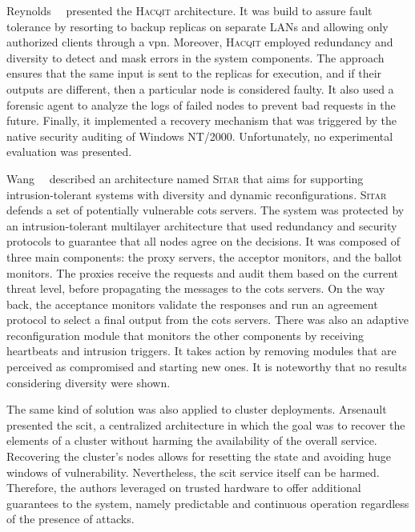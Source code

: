 Reynolds~\etal{}~\cite{Reynolds:2002} presented the \textsc{Hacqit} architecture.
It was build to assure fault tolerance by resorting to backup replicas on separate LANs and allowing only authorized clients through a \gls{vpn}.
Moreover, \textsc{Hacqit} employed redundancy and diversity to detect and mask errors in the system components.
The approach ensures that the same input is sent to the replicas for execution, and if their outputs are different, then a particular node is considered faulty. 
It also used a forensic agent to analyze the logs of failed nodes to prevent bad requests in the future.
Finally, it implemented a recovery mechanism that was triggered by the native security auditing of Windows NT/2000.
Unfortunately, no experimental evaluation was presented.


Wang~\etal{}~\cite{Wang:2003} described an architecture named \textsc{Sitar} that aims for supporting intrusion-tolerant systems with diversity and dynamic reconfigurations.
\textsc{Sitar} defends a set of potentially vulnerable \gls{cots} servers. 
The system was protected by an intrusion-tolerant multilayer architecture that used redundancy and security protocols to guarantee that all nodes agree on the decisions.
It was composed of three main components: the proxy servers, the acceptor monitors, and the ballot monitors.
The proxies receive the requests and audit them based on the current threat level, before propagating the messages to the \gls{cots} servers. 
On the way back, the acceptance monitors validate the responses and run an agreement protocol to select a final output from the \gls{cots} servers.
There was also an adaptive reconfiguration module that monitors the other components by receiving heartbeats and intrusion triggers.
It takes action by removing modules that are perceived as compromised and starting new ones.
It is noteworthy that no results considering diversity were shown.


The same kind of solution was also applied to cluster deployments.
Arsenault~\etal{}~\cite{Arsenault:2007} presented the \gls{scit}, a centralized architecture in which the goal was to recover the elements of a cluster without harming the availability of the overall service.
Recovering the cluster's nodes allows for resetting the state and avoiding huge windows of vulnerability.
Nevertheless, the \gls{scit} service itself can be harmed. 
Therefore, the authors leveraged on trusted hardware to offer additional guarantees to the system, namely predictable and continuous operation regardless of the presence of attacks.


